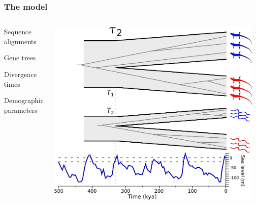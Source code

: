 \begin{frame}
    \frametitle{The \msb model}
    \begin{columns}[c]
            \begin{mydescription}
                \item<2->[\alignmentVector] Sequence alignments
                \item<2->[\geneTreeVector] Gene trees
                \item<2->[\divTimeMapVector] Divergence times
                \item<2->[\demographicParamVector] Demographic parameters
            \end{mydescription}
            \includegraphics[width=\textwidth]{../images/sea-level-species-trees-gene-trees.pdf}
    \end{columns}
\end{frame}


